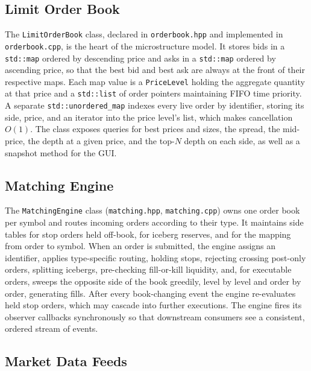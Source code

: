 \documentclass[12pt,oneside,a4paper]{report}
\begin{document}
\subsection{Limit Order Book}

The \texttt{LimitOrderBook} class, declared in \texttt{orderbook.hpp} and implemented in \texttt{orderbook.cpp}, is the heart of the microstructure model. It stores bids in a \texttt{std::map} ordered by descending price and asks in a \texttt{std::map} ordered by ascending price, so that the best bid and best ask are always at the front of their respective maps. Each map value is a \texttt{PriceLevel} holding the aggregate quantity at that price and a \texttt{std::list} of order pointers maintaining FIFO time priority. A separate \texttt{std::unordered\_map} indexes every live order by identifier, storing its side, price, and an iterator into the price level's list, which makes cancellation $O(1)$. The class exposes queries for best prices and sizes, the spread, the mid-price, the depth at a given price, and the top-$N$ depth on each side, as well as a snapshot method for the GUI.

\subsection{Matching Engine}

The \texttt{MatchingEngine} class (\texttt{matching.hpp}, \texttt{matching.cpp}) owns one order book per symbol and routes incoming orders according to their type. It maintains side tables for stop orders held off-book, for iceberg reserves, and for the mapping from order to symbol. When an order is submitted, the engine assigns an identifier, applies type-specific routing, holding stops, rejecting crossing post-only orders, splitting icebergs, pre-checking fill-or-kill liquidity, and, for executable orders, sweeps the opposite side of the book greedily, level by level and order by order, generating fills. After every book-changing event the engine re-evaluates held stop orders, which may cascade into further executions. The engine fires its observer callbacks synchronously so that downstream consumers see a consistent, ordered stream of events.

\subsection{Market Data Feeds}
\end{document}
